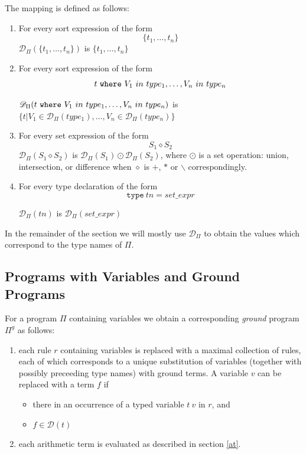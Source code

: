 \documentclass[a4paper,10pt]{article}
\begin{document}
\medskip\noindent 
The mapping is defined as follows:

\begin{enumerate}
\item For every sort expression of the form $$\{t_1,\ldots,t_n\}$$   $\mathcal{D}_\Pi(\{t_1,\ldots,t_n\})$ is $ \{t_1,\ldots,t_n\}$
\item For every sort expression of the form   $$t~\mbox{\texttt{where}} ~V_1~in~type_1,\ldots, V_n~in~type_n$$
 
\noindent
$\mathcal{D}_\Pi(t~\mbox{\texttt{where}} ~V_1~in~type_1,\ldots, V_n~in~type_n)$ is $\{t| V_1 \in \mathcal{D}_\Pi(type_1),\ldots, V_n \in \mathcal{D}_\Pi(type_n)\}$ 
\item For every set expression of the form $$S_1 \diamond S_2$$ 
$\mathcal{D}_\Pi(S_1 \diamond S_2)$ is $ \mathcal{D}_\Pi(S_1) \odot  \mathcal{D}_\Pi(S_2)$, where $\odot$ is a set operation: union, intersection, or difference when $\diamond$ is $+$, $*$ or $\backslash$ correspondingly.

\item For every type declaration of the form $$\texttt{type}~tn = set\_expr$$

$\mathcal{D}_\Pi(tn)$ is $\mathcal{D}_\Pi(set\_expr)$  


\end{enumerate}

\medskip\noindent
In the remainder of the section  we will mostly  use   $\mathcal{D}_\Pi$ to obtain the values  which correspond to the type names of $\Pi$.

\subsection{Programs with Variables and Ground Programs}\label{grp}

For a program $\Pi$ containing variables we obtain a corresponding \textit{ground} program $\Pi^g$ as follows:
\begin{enumerate}
\item each rule $r$ containing variables is replaced with a maximal collection of rules, each of which corresponds to a unique substitution 
of  variables (together with possibly preceeding type names)  with ground terms. A variable $v$ can be replaced with a term $f$ if
\begin{itemize}
\item there in an occurrence of a typed variable $t~v$ in $r$, and
\item  $f\in \mathcal{D}(t)$
\end{itemize}  
\item each arithmetic term is evaluated as described in section  \ref{at}.
\end{enumerate}
\end{document}

